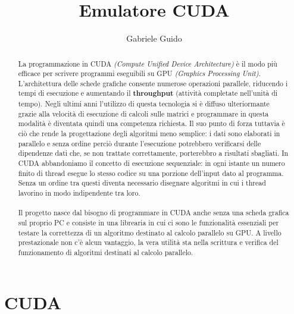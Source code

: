 \documentclass[binding=0.6cm, noexaminfo]{sapthesis}\usepackage{microtype}
\title{Emulatore CUDA}
\author{Gabriele Guido}
\begin{document}
\frontmatter
\maketitle
\dedication{Dedicato a nonna}

\begin{abstract}
    La programmazione in CUDA \textit{(Compute Unified Device Architecture)} è il modo
    più efficace per scrivere programmi eseguibili su GPU \textit{(Graphics Processing Unit)}. L'architettura
    delle schede grafiche consente numerose operazioni parallele, riducendo i tempi di esecuzione e aumentando
    il \textbf{throughput} (attività completate nell'unità di tempo). Negli ultimi anni l'utilizzo
    di questa tecnologia si è diffuso ulteriormante
     grazie alla velocità di esecuzione di calcoli sulle matrici e programmare in questa 
    modalità è diventata quindi una competenza richiesta. Il suo 
    punto di forza tuttavia è ciò che rende la progettazione degli algoritmi meno semplice: i dati 
    sono elaborati in parallelo e senza ordine perciò durante l'esecuzione potrebbero verificarsi delle dipendenze 
    dati che, se non trattate correttamente, porterebbro a risultati sbagliati. In CUDA 
    abbandoniamo il concetto di esecuzione sequenziale: in ogni istante un numero finito di thread 
    esegue lo stesso codice su una porzione dell'input dato al programma. Senza un ordine tra questi 
    diventa necessario disegnare algoritmi in cui i thread lavorino in modo indipendente tra loro.  
    \\\\
    Il progetto nasce dal bisogno di programmare in CUDA anche senza una scheda grafica sul proprio PC e
    consiste in una librearia in cui ci sono le funzionalità essenziali per testare la correttezza di 
        un algoritmo destinato al calcolo parallelo su GPU. A livello 
        prestazionale non c'è alcun vantaggio, la vera utilità sta nella scrittura e verifica 
    del funzionamento di algoritmi destinati al calcolo parallelo.
    
\end{abstract}

\tableofcontents

\mainmatter
\chapter{CUDA}
\end{document}
